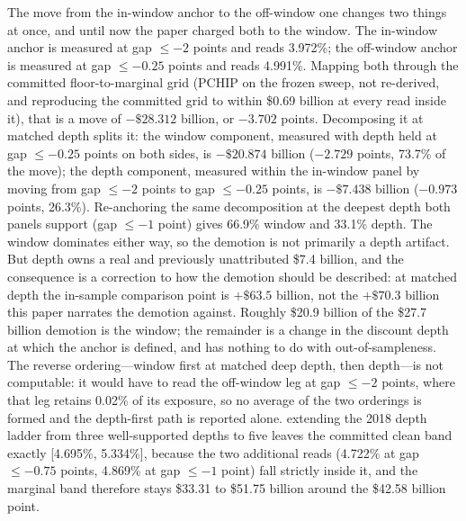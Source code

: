 \documentclass[12pt]{article}
\begin{document}
The move from the in-window anchor to the off-window one changes two things at once, and until now the paper charged both to the window. The in-window anchor is measured at gap $\leq -2$ points and reads 3.972\%; the off-window anchor is measured at gap $\leq -0.25$ points and reads 4.991\%. Mapping both through the committed floor-to-marginal grid (PCHIP on the frozen sweep, not re-derived, and reproducing the committed grid to within \$0.69 billion at every read inside it), that is a move of $-\$28.312$ billion, or $-3.702$ points. Decomposing it at matched depth splits it: the window component, measured with depth held at gap $\leq -0.25$ points on both sides, is $-\$20.874$ billion ($-2.729$ points, 73.7\% of the move); the depth component, measured within the in-window panel by moving from gap $\leq -2$ points to gap $\leq -0.25$ points, is $-\$7.438$ billion ($-0.973$ points, 26.3\%). Re-anchoring the same decomposition at the deepest depth both panels support (gap $\leq -1$ point) gives 66.9\% window and 33.1\% depth. The window dominates either way, so the demotion is not primarily a depth artifact. But depth owns a real and previously unattributed \$7.4 billion, and the consequence is a correction to how the demotion should be described: at matched depth the in-sample comparison point is $+\$63.5$ billion, not the $+\$70.3$ billion this paper narrates the demotion against. Roughly \$20.9 billion of the \$27.7 billion demotion is the window; the remainder is a change in the discount depth at which the anchor is defined, and has nothing to do with out-of-sampleness. The reverse ordering---window first at matched deep depth, then depth---is not computable: it would have to read the off-window leg at gap $\leq -2$ points, where that leg retains 0.02\% of its exposure, so no average of the two orderings is formed and the depth-first path is reported alone. extending the 2018 depth ladder from three well-supported depths to five leaves the committed clean band exactly [4.695\%, 5.334\%], because the two additional reads (4.722\% at gap $\leq -0.75$ points, 4.869\% at gap $\leq -1$ point) fall strictly inside it, and the marginal band therefore stays \$33.31 to \$51.75 billion around the \$42.58 billion point.
\end{document}
